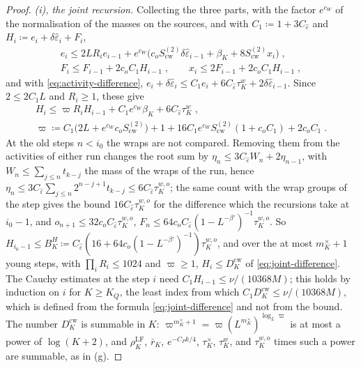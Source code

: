 \documentclass[11pt]{preprint}
\numberwithin{equation}{section}
\theoremstyle{definition}
\theoremstyle{remark}
\theoremstyle{plain}
\begin{document}
\begin{proof}
\emph{(i), the joint recursion.} Collecting the three parts, with the factor $e^{c_W}$ of the normalisation of the masses on the sources, and with $C_1 \coloneqq 1 + 3C_{\hat\varepsilon}$ and $H_i \coloneqq e_i + \delta\hat\varepsilon_i + F_i$,
\begin{gather*}
    e_i \leq 2LR_ie_{i-1} + e^{c_W}\bigl(c_oS^{(2)}_{\mathrm{cw}}\delta\hat\varepsilon_{i-1} + \beta_K + 8S^{(2)}_{\mathrm{cw}}x_i\bigr)\;,\\
    F_i \leq F_{i-1} + 2c_oC_1H_{i-1}\;,
    \qquad
    x_i \leq 2F_{i-1} + 2c_oC_1H_{i-1}\;,
\end{gather*}
and with \eqref{eq:activity-difference}, $e_i + \delta\hat\varepsilon_i \leq C_1e_i + 6C_{\hat\varepsilon}\tau^w_K + 2\delta\hat\varepsilon_{i-1}$. Since $2 \leq 2C_1L$ and $R_i \geq 1$, these give
\begin{gather*}
    H_i \leq \varpi R_iH_{i-1} + C_1e^{c_W}\beta_K + 6C_{\hat\varepsilon}\tau^w_K\;,\\
    \varpi \coloneqq C_1\bigl(2L + e^{c_W}c_oS^{(2)}_{\mathrm{cw}}\bigr) + 1 + 16C_1e^{c_W}S^{(2)}_{\mathrm{cw}}(1 + c_oC_1) + 2c_oC_1\;.
\end{gather*}
At the old steps $n < i_0$ the wraps are not compared. Removing them from the activities of either run changes the root sum by $\eta_n \leq 3C_{\hat\varepsilon}W_n + 2\eta_{n-1}$, with $W_n \leq \sum_{j \leq n}t_{k-j}$ the mass of the wraps of the run, hence $\eta_n \leq 3C_{\hat\varepsilon}\sum_{j \leq n}2^{n-j+1}t_{k-j} \leq 6C_{\hat\varepsilon}\tau^{w,o}_K$; the same count with the wrap groups of the step gives the bound $16C_{\hat\varepsilon}\tau^{w,o}_K$ for the difference which the recursions take at $i_0 - 1$, and $o_{n+1} \leq 32c_oC_{\hat\varepsilon}\tau^{w,o}_K$, $F_n \leq 64c_oC_{\hat\varepsilon}(1 - L^{-\beta'})^{-1}\tau^{w,o}_K$. So $H_{i_0-1} \leq B^H_K \coloneqq C_{\hat\varepsilon}(16 + 64c_o(1 - L^{-\beta'})^{-1})\tau^{w,o}_K$, and over the at most $m^\times_K + 1$ young steps, with $\prod_iR_i \leq 1024$ and $\varpi \geq 1$, $H_i \leq D^{\mathrm{cw}}_K$ of \eqref{eq:joint-difference}. The Cauchy estimates at the step $i$ need $C_1H_{i-1} \leq \nu/(10368M)$; this holds by induction on $i$ for $K \geq K_Q$, the least index from which $C_1D^{\mathrm{cw}}_K \leq \nu/(10368M)$, which is defined from the formula \eqref{eq:joint-difference} and not from the bound. The number $D^{\mathrm{cw}}_K$ is summable in $K$: $\varpi^{m^\times_K+1} = \varpi(L^{m^\times_K})^{\log_L\varpi}$ is at most a power of $\log(K + 2)$, and $\rho^{\mathrm{LF}}_K$, $\bar r_K$, $e^{-C_Pk/4}$, $\tau^\times_K$, $\tau^w_K$, and $\tau^{w,o}_K$ times such a power are summable, as in (g).


\end{proof}
\end{document}
